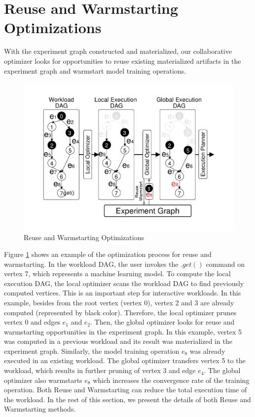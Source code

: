 \section{Reuse and Warmstarting Optimizations}\label{sec-reuse-and-warmstarting}
With the experiment graph constructed and materialized, our collaborative optimizer looks for opportunities to reuse existing materialized artifacts in the experiment graph and warmstart model training operations.
\begin{figure}
\centering
\includegraphics[width=\columnwidth]{../images/reuse-optimization}
\caption{Reuse and Warmstarting Optimizations}
\label{reuse-warmstart-figure}
\end{figure}
Figure \ref{reuse-warmstart-figure} shows an example of the optimization process for reuse and warmstarting.
In the workload DAG, the user invokes the $.get()$ command on vertex 7, which represents a machine learning model.
To compute the local execution DAG, the local optimizer scans the workload DAG to find previously computed vertices. 
This is an important step for interactive workloads.
In this example, besides from the root vertex (vertex 0), vertex 2 and 3 are already computed (represented by black color).
Therefore, the local optimizer prunes vertex 0 and edges $e_1$ and $e_2$.
Then, the global optimizer looks for reuse and warmstarting opportunities in the experiment graph.
In this example, vertex 5 was computed in a previous workload and its result was materialized in the experiment graph.
Similarly, the model training operation $e_8$ was already executed in an existing workload.
The global optimizer transfers vertex 5 to the workload, which results in further pruning of vertex 3 and edge $e_4$.
The global optimizer also warmstarts $e_8$ which increases the convergence rate of the training operation.
Both Reuse and Warmstarting can reduce the total execution time of the workload.
In the rest of this section, we present the details of both Reuse and Warmstarting methods.


